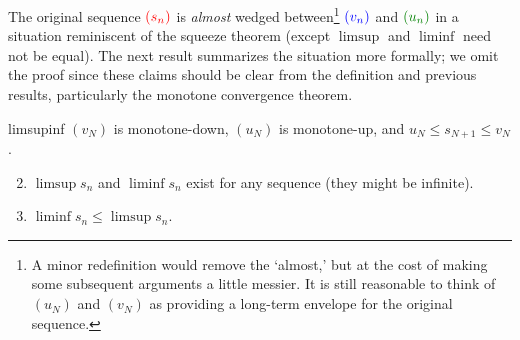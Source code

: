 The original sequence $\textcolor{red}{(s_n)}$ is \emph{almost} wedged between\footnote{A minor redefinition would remove the `almost,' but at the cost of making some subsequent arguments a little messier. It is still reasonable to think of $(u_N)$ and $(v_N)$ as providing a long-term envelope for the original sequence.} $\textcolor{blue}{(v_n)}$ and $\textcolor{Green}{(u_n)}$ in a situation reminiscent of the squeeze theorem (except $\limsup$ and $\liminf$ need not be equal). The next result summarizes the situation more formally; we omit the proof since these claims should be clear from the definition and previous results, particularly the monotone convergence theorem.


\begin{lemm}{}{limsupinf}
	\exstart $(v_N)$ is monotone-down, $(u_N)$ is monotone-up, and $u_N\le s_{N+1}\le v_N$.
	\begin{enumerate}\setcounter{enumi}{1}
	  \item\label{lemm:limsupinf1} $\limsup s_n$ and $\liminf s_n$ exist for any sequence (they might be infinite).
	  \item $\liminf s_n\le\limsup s_n$.
	\end{enumerate}
\end{lemm}




